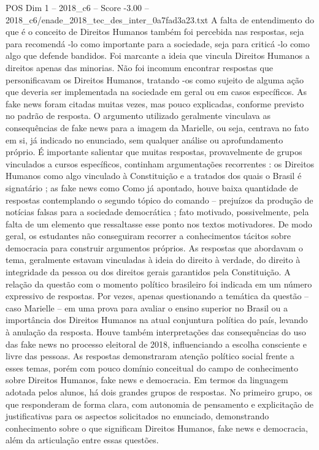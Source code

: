 \begin{textsample}{POS Dim 1 – 2018\_c6 – Score -3.00 – 2018\_c6/enade\_2018\_tec\_des\_inter\_0a7fad3a23.txt}
A falta de entendimento do que é o conceito de Direitos Humanos também foi percebida nas respostas, seja para recomendá -lo como importante para a sociedade, seja para criticá -lo como algo que defende bandidos.
Foi marcante a ideia que vincula Direitos Humanos a direitos apenas das minorias.
Não foi incomum encontrar respostas que personificavam os Direitos Humanos, tratando -os como sujeito de alguma ação que deveria ser implementada na sociedade em geral ou em casos específicos.
As fake news foram citadas muitas vezes, mas pouco explicadas, conforme previsto no padrão de resposta.
O argumento utilizado geralmente vinculava as consequências de fake news para a imagem da Marielle, ou seja, centrava no fato em si, já indicado no enunciado, sem qualquer análise ou aprofundamento próprio.
É importante salientar que muitas respostas, provavelmente de grupos vinculados a cursos específicos, continham argumentações recorrentes : os Direitos Humanos como algo vinculado à Constituição e a tratados dos quais o Brasil é signatário ; as fake news como Como já apontado, houve baixa quantidade de respostas contemplando o segundo tópico do comando – prejuízos da produção de notícias falsas para a sociedade democrática ; fato motivado, possivelmente, pela falta de um elemento que ressaltasse esse ponto nos textos motivadores.
De modo geral, os estudantes não conseguiram recorrer a conhecimentos tácitos sobre democracia para construir argumentos próprios.
As respostas que abordavam o tema, geralmente estavam vinculadas à ideia do direito à verdade, do direito à integridade da pessoa ou dos direitos gerais garantidos pela Constituição.
A relação da questão com o momento político brasileiro foi indicada em um número expressivo de respostas.
Por vezes, apenas questionando a temática da questão – caso Marielle – em uma prova para avaliar o ensino superior no Brasil ou a importância dos Direitos Humanos na atual conjuntura política do país, levando à anulação da resposta.
Houve também interpretações das consequências do uso das fake news no processo eleitoral de 2018, influenciando a escolha consciente e livre das pessoas.
As respostas demonstraram atenção político social frente a esses temas, porém com pouco domínio conceitual do campo de conhecimento sobre Direitos Humanos, fake news e democracia.
Em termos da linguagem adotada pelos alunos, há dois grandes grupos de respostas.
No primeiro grupo, os que responderam de forma clara, com autonomia de pensamento e explicitação de justificativas para os aspectos solicitados no enunciado, demonstrando conhecimento sobre o que significam Direitos Humanos, fake news e democracia, além da articulação entre essas questões.

\end{textsample}
